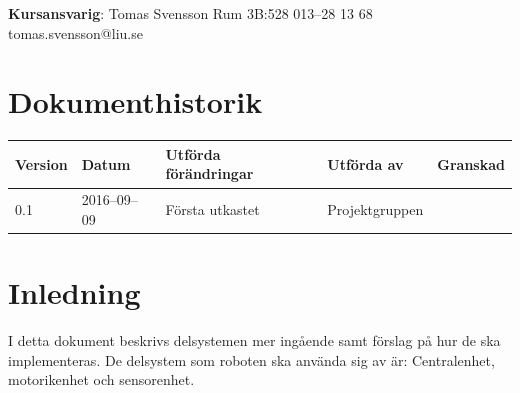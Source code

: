 \documentclass[a4paper,titlepage,12pt]{article}
\begin{document}
\begin{center}
		\centering
		\textbf{Kursansvarig}: Tomas Svensson Rum 3B:528 013--28 13 68 tomas.svensson@liu.se

		\newpage
		\tableofcontents
		\newpage



		\section*{Dokumenthistorik}
		\begin{table}[h]
			\begin{tabular}[pos]{ l l l l l }
				\textbf{Version} & \textbf{Datum} & \textbf{Utförda förändringar} 
				& \textbf{Utförda av} & \textbf{Granskad} \\ \midrule

				0.1 & 2016--09--09 & Första utkastet & Projektgruppen & \\

			\end{tabular}
		\end{table}
	\end{center}


	\newpage

	\section{Inledning}
	I detta dokument beskrivs delsystemen mer ingående samt förslag på hur de ska 
    implementeras. De delsystem som roboten ska använda sig av är:
	Centralenhet, motorikenhet och sensorenhet.


  \newpage
\end{document}
